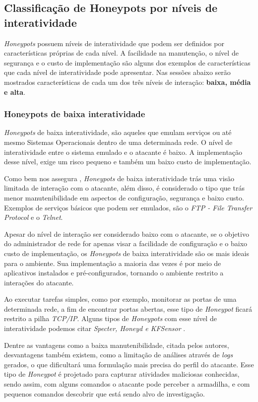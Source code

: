 \subsection{Classificação de Honeypots por níveis de interatividade}
\textit{Honeypots} possuem níveis de interatividade que podem ser definidos por características próprias de cada nível. A facilidade na manutenção, o nível de segurança e o custo de implementação são alguns dos exemplos de características que cada nível de interatividade pode apresentar. Nas sessões abaixo serão mostrados características de cada um dos três níveis de interação: \textbf{baixa, média e alta}.

\subsubsection{Honeypots de baixa interatividade}
\textit{Honeypots} de baixa interatividade, são aqueles que emulam serviços ou até mesmo Sistemas Operacionais dentro de uma determinada rede. O nível de interatividade entre o sistema emulado e o atacante é baixo. A implementação desse nível, exige um risco pequeno e também um baixo custo de implementação.

Como bem nos assegura , \textit{Honeypots} de baixa interatividade trás uma visão limitada de interação com o atacante, além disso, é considerado o tipo que trás menor manutenibilidade em aspectos de configuração, segurança e baixo custo. Exemplos de serviços básicos que podem ser emulados, são o \textit{FTP - File Transfer Protocol} e o \textit{Telnet}.

Apesar do nível de interação ser considerado baixo com o atacante, se o objetivo do administrador de rede for apenas visar a facilidade de configuração e o baixo custo de implementação, os \textit{Honeypots} de baixa interatividade são os mais ideais para o ambiente. Sua implementação a maioria das vezes é por meio de aplicativos instalados e pré-configurados, tornando o ambiente restrito a interações do atacante.

Ao executar tarefas simples, como por exemplo, monitorar as portas de uma determinada rede, a fim de encontrar portas abertas, esse tipo de \textit{Honeypot} ficará restrito a pilha \textit{TCP/IP}. Alguns tipos de \textit{Honeypots} com esse nível de interatividade podemos citar \textit{Specter, Honeyd e KFSensor} \cite{carbonemecanismo}.

Dentre as vantagens como a baixa manutenibilidade, citada pelos autores, desvantagens também existem, como a limitação de análises através de \textit{logs} gerados, o que dificultará uma formulação mais precisa do perfil do atacante. Esse tipo de \textit{Honeypot} é projetado para capturar atividades maliciosas conhecidas, sendo assim, com alguns comandos o atacante pode perceber a armadilha, e com pequenos comandos descobrir que está sendo alvo de investigação.

